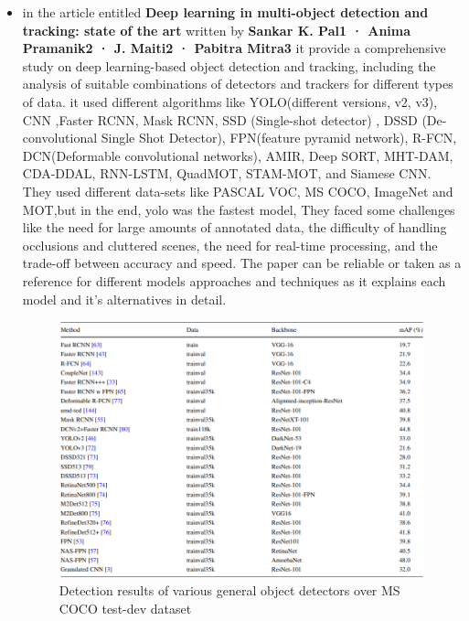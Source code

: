 \documentclass[12pt]{article}
\begin{document}
\begin{itemize}
        \item in the article entitled \textbf{Deep learning in multi-object detection and tracking: state of the art}\cite{Pal2021-re} written by \textbf{Sankar K. Pal1 · Anima Pramanik2 · J. Maiti2 · Pabitra Mitra3} it provide a comprehensive study on deep learning-based object detection and tracking, including the analysis of suitable combinations of detectors and trackers for different types of data. it used different algorithms like YOLO(different versions, v2, v3), CNN ,Faster RCNN, Mask RCNN, SSD (Single-shot detector) , DSSD (De-convolutional Single Shot Detector), FPN(feature pyramid network), R-FCN, DCN(Deformable convolutional networks), AMIR, Deep SORT, MHT-DAM, CDA-DDAL, RNN-LSTM, QuadMOT, STAM-MOT, and Siamese CNN. They used different data-sets like PASCAL VOC, MS COCO, ImageNet and MOT,but in the end, yolo was the fastest model, They faced some challenges like the need for large amounts of annotated data, the difficulty of handling occlusions and cluttered scenes, the need for real-time processing, and the trade-off between accuracy and speed. The paper can be reliable or taken as a reference for different models approaches and techniques as it explains each model and it's alternatives in detail.
                \begin{figure}[H]
        \centering
        \includegraphics[width=1\linewidth]{figures/detection ms coco.PNG}
        \caption{Detection results of various general object detectors over MS COCO test-dev dataset}
        \label{fig:Detection results of various general object detectors over MS COCO test-dev dataset. }
        \end{figure}


\end{itemize}
\end{document}
